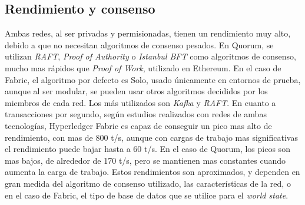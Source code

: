 \subsection*{Rendimiento y consenso}
Ambas redes, al ser privadas y permisionadas, tienen un rendimiento muy alto, debido a que no necesitan algoritmos de consenso pesados. En Quorum, se utilizan \textit{RAFT}, \textit{Proof of Authority} o \textit{Istanbul BFT} como algoritmos de consenso, mucho mas rápidos que \textit{Proof of Work}, utilizado en Ethereum. En el caso de Fabric, el algoritmo por defecto es Solo, usado únicamente en entornos de prueba, aunque al ser modular, se pueden usar otros algoritmos decididos por los miembros de cada red. Los más utilizados son \textit{Kafka} y \textit{RAFT}.
En cuanto a transacciones por segundo, según estudios realizados con redes de ambas tecnologías, \cite{fabric-benchmark} \cite{quorum-benchmark} Hyperledger Fabric es capaz de conseguir un pico mas alto de rendimiento, con mas de 800 t/s, aunque con cargas de trabajo mas significativas el rendimiento puede bajar hasta a 60 t/s. En el caso de Quorum, los picos son mas bajos, de alrededor de 170 t/s, pero se mantienen mas constantes cuando aumenta la carga de trabajo. Estos rendimientos son aproximados, y dependen en gran medida del algoritmo de consenso utilizado, las características de la red, o en el caso de Fabric, el tipo de base de datos que se utilice para el \textit{world state}.
\clearpage
